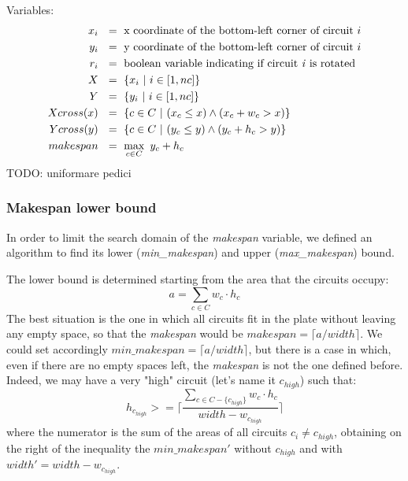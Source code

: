     Variables:
    \begin{align*}
        x_i\        &\ =\ \text{x coordinate of the bottom-left corner of circuit  } i        \\
        y_i\        &\ =\ \text{y coordinate of the bottom-left corner of circuit  } i        \\
        r_i\        &\ =\ \text{boolean variable indicating if circuit \textit{i} is rotated} \\
        X\          &\ =\ \{ x_i\ |\ i \in [1, nc]\}                                          \\
        Y\          &\ =\ \{ y_i\ |\ i \in [1, nc]\}                                          \\
        Xcross(x)\  &\ =\ \{ c \in C\ |\ (x_c \leq x) \land (x_c + w_c > x) \}                \\
        Ycross(y)\  &\ =\ \{ c \in C\ |\ (y_c \leq y) \land (y_c + h_c > y) \}                \\
        makespan\   &\ =\ \max_{c \in C}\ y_c + h_c
    \end{align*}
    \colorbox{BurntOrange}{TODO: uniformare pedici}

    \subsubsection{Makespan lower bound}
        In order to limit the search domain of the \textit{makespan} variable, we defined an algorithm to find 
        its lower (\textit{min\_makespan}) and upper (\textit{max\_makespan}) bound.

        The lower bound is determined starting from the area that the circuits occupy: 
        \begin{equation}
            a = \sum_{c \in C} w_c \cdot h_c
        \end{equation}
        The best situation is the one in which all circuits fit in the plate 
        without leaving any empty space, so that the \textit{makespan} would be $makespan = \lceil a / width \rceil$. 
        We could set accordingly $min\_makespan = \lceil a / width \rceil$, but there is a case in which,
        even if there are no empty spaces left, the \textit{makespan} is not the one defined before. 
        Indeed, we may have a very "high" circuit (let's name it $c_{high}$) such that:
        \begin{equation}
            h_{c_{high}} >= \lceil \frac{\sum_{c \in C - \{c_{high}\}} w_c \cdot h_c}{width - w_{c_{high}}} \rceil
            \label{eq:h_high}
        \end{equation}
        where the numerator is the sum of the areas of all circuits $c_i \neq c_{high}$, obtaining on the right of
        the inequality the $min\_makespan'$ without $c_{high}$ and with $width' = width - w_{c_{high}}$.

